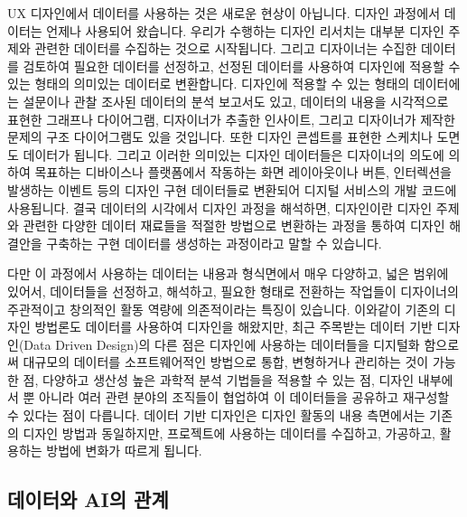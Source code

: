 \documentclass[
  letterpaper,
]{book}
\begin{document}
UX 디자인에서 데이터를 사용하는 것은 새로운 현상이 아닙니다. 디자인
과정에서 데이터는 언제나 사용되어 왔습니다. 우리가 수행하는 디자인
리서치는 대부분 디자인 주제와 관련한 데이터를 수집하는 것으로
시작됩니다. 그리고 디자이너는 수집한 데이터를 검토하여 필요한 데이터를
선정하고, 선정된 데이터를 사용하여 디자인에 적용할 수 있는 형태의
의미있는 데이터로 변환합니다. 디자인에 적용할 수 있는 형태의 데이터에는
설문이나 관찰 조사된 데이터의 분석 보고서도 있고, 데이터의 내용을
시각적으로 표현한 그래프나 다이어그램, 디자이너가 추출한 인사이트,
그리고 디자이너가 제작한 문제의 구조 다이어그램도 있을 것입니다. 또한
디자인 콘셉트를 표현한 스케치나 도면도 데이터가 됩니다. 그리고 이러한
의미있는 디자인 데이터들은 디자이너의 의도에 의하여 목표하는 디바이스나
플랫폼에서 작동하는 화면 레이아웃이나 버튼, 인터렉션을 발생하는 이벤트
등의 디자인 구현 데이터들로 변환되어 디지털 서비스의 개발 코드에
사용됩니다. 결국 데이터의 시각에서 디자인 과정을 해석하면, 디자인이란
디자인 주제와 관련한 다양한 데이터 재료들을 적절한 방법으로 변환하는
과정을 통하여 디자인 해결안을 구축하는 구현 데이터를 생성하는 과정이라고
말할 수 있습니다.

다만 이 과정에서 사용하는 데이터는 내용과 형식면에서 매우 다양하고, 넓은
범위에 있어서, 데이터들을 선정하고, 해석하고, 필요한 형태로 전환하는
작업들이 디자이너의 주관적이고 창의적인 활동 역량에 의존적이라는 특징이
있습니다. 이와같이 기존의 디자인 방법론도 데이터를 사용하여 디자인을
해왔지만, 최근 주목받는 데이터 기반 디자인(Data Driven Design)의 다른
점은 디자인에 사용하는 데이터들을 디지털화 함으로써 대규모의 데이터를
소프트웨어적인 방법으로 통합, 변형하거나 관리하는 것이 가능한 점,
다양하고 생산성 높은 과학적 분석 기법들을 적용할 수 있는 점, 디자인
내부에서 뿐 아니라 여러 관련 분야의 조직들이 협업하여 이 데이터들을
공유하고 재구성할 수 있다는 점이 다릅니다. 데이터 기반 디자인은 디자인
활동의 내용 측면에서는 기존의 디자인 방법과 동일하지만, 프로젝트에
사용하는 데이터를 수집하고, 가공하고, 활용하는 방법에 변화가 따르게
됩니다.

\subsection{데이터와 AI의
관계}\label{uxb370uxc774uxd130uxc640-aiuxc758-uxad00uxacc4}
\end{document}
